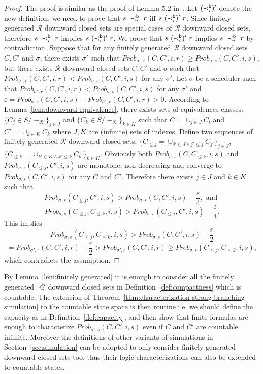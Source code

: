 \documentclass{LMCS}
\def\epsilon{\varepsilon}
\newcommand{\iBSi}[1]{\prec_{#1}^{{\sf b}}}
\newcommand{\MC}[1]{\mathcal{#1}}
\newcommand{\MEASURE}{\mathit{Prob}}
\begin{document}
\begin{proof}
  The proof is similar as the proof of Lemma 5.2
  in~\cite{HermannsPSWZ11}. Let $(\iBSi{i})'$ denote the new
  definition, we need to prove that $s~\iBSi{i}~r$ iff
  $s~(\iBSi{i})'~r$. Since finitely generated $\MC{R}$ downward closed
  sets are special cases of $\MC{R}$ downward closed sets, therefore
  $s~\iBSi{i}~r$ implies $s~(\iBSi{i})'~r$. We prove that
  $s~(\iBSi{i})'~r$ implies $s~\iBSi{i}~r$ by contradiction. Suppose
  that for any finitely generated $\MC{R}$ downward closed sets $C,C'$
  and $\sigma$, there exists $\sigma'$ such that
  $\MEASURE_{\sigma',r}(C,C',i,r)\geq\MEASURE_{\sigma,s}(C,C',i,s)$, but
  there exists $\MC{R}$ downward closed sets $C,C'$ and $\sigma$ such
  that $\MEASURE_{\sigma',r}(C,C',i,r)<\MEASURE_{\sigma,s}(C,C',i,s)$ for
  any $\sigma'$. Let $\sigma$ be a scheduler such that
  $\MEASURE_{\sigma',r}(C,C',i,r)<\MEASURE_{\sigma,s}(C,C',i,s)$ for any
  $\sigma'$ and
  $\epsilon=\MEASURE_{\sigma,s}(C,C',i,s)-\MEASURE_{\sigma',r}(C,C',i,r)>0$. According
  to Lemma~\ref{lem:downward equivalence}, there exists sets of
  equivalences classes: $\{C_j\in S/\equiv_{\MC{R}}\}_{j\in J}$ and
  $\{C_k\in S/\equiv_{\MC{R}}\}_{k\in K}$ such that $C=\cup_{j\in
    J}C_i$ and $C'=\cup_{k\in K}C_k$ where $J,K$ are (infinite) sets
  of indexes. Define two sequences of finitely generated $\MC{R}$
  downward closed sets: $\{C_{\leq j}=\cup_{j'\in J\land j'\leq
    j}C_{j'}\}_{ j\in J}$, $\{C_{\leq k}=\cup_{k'\in K\land k'\leq k}C_{k'}\}_{k\in K}.$ Obviously both $\MEASURE_{\sigma,s}(C,C_{\leq k},i,s)$ and
  $\MEASURE_{\sigma,s}(C_{\leq j},C',i,s)$ are monotone, non-decreasing
  and converge to $\MEASURE_{\sigma,s}(C,C',i,s)$ for any $C$ and
  $C'$. Therefore there exists $j\in J$ and $k\in K$ such that
$$\MEASURE_{\sigma,s}(C_{\leq j},C',i,s)>\MEASURE_{\sigma,s}(C,C',i,s) - \frac{\epsilon}{4}, \text{ and }$$
$$\MEASURE_{\sigma,s}(C_{\leq j},C_{\leq k},i,s)>\MEASURE_{\sigma,s}(C_{\leq j},C',i,s) - \frac{\epsilon}{4}.$$
This implies
$$\MEASURE_{\sigma,s}(C_{\leq j},C_{\leq k},i,s) > \MEASURE_{\sigma,s}(C,C',i,s) - \frac{\epsilon}{2}$$$$=\MEASURE_{\sigma',r}(C,C',i,r) + \frac{\epsilon}{2}>\MEASURE_{\sigma',r}(C,C',i,r)\geq \MEASURE_{\sigma,s}(C_{\leq j},C_{\leq k},i,s),$$
which contradicts the assumption.
\end{proof}

By Lemma~\ref{lem:finitely generated} it is enough to consider all the finitely generated $\iBSi{i}$ downward closed sets in Definition~\ref{def:compactness} which is countable. The extension of Theorem~\ref{thm:characterization strong branching simulation} to the countable state space is then routine i.e. we should define the capacity as in Definition~\ref{def:capacity}, and then show that finite formulas are enough to characterize $\MEASURE_{\sigma',s}(C,C',i,s)$ even if $C$ and $C'$ are countable infinite. Moreover the definitions of other variants of simulations in Section~\ref{sec:simulation} can be adopted to only consider finitely generated downward closed sets too, thus their logic characterizations can also be extended to countable states.
\end{document}
